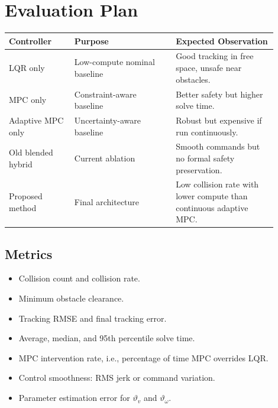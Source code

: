 \documentclass[11pt,a4paper]{article}
\begin{document}
\section{Evaluation Plan}
\begin{table}[h]
\centering
\small
\begin{tabular}{p{0.22\linewidth}p{0.34\linewidth}p{0.34\linewidth}}
\toprule
\textbf{Controller} & \textbf{Purpose} & \textbf{Expected Observation} \\
\midrule
LQR only & Low-compute nominal baseline & Good tracking in free space, unsafe near obstacles. \\
MPC only & Constraint-aware baseline & Better safety but higher solve time. \\
Adaptive MPC only & Uncertainty-aware baseline & Robust but expensive if run continuously. \\
Old blended hybrid & Current ablation & Smooth commands but no formal safety preservation. \\
Proposed method & Final architecture & Low collision rate with lower compute than continuous adaptive MPC. \\
\bottomrule
\end{tabular}
\end{table}

\subsection{Metrics}
\begin{itemize}
    \item Collision count and collision rate.
    \item Minimum obstacle clearance.
    \item Tracking RMSE and final tracking error.
    \item Average, median, and 95th percentile solve time.
    \item MPC intervention rate, i.e., percentage of time MPC overrides LQR.
    \item Control smoothness: RMS jerk or command variation.
    \item Parameter estimation error for $\vartheta_v$ and $\vartheta_\omega$.
\end{itemize}
\end{document}
